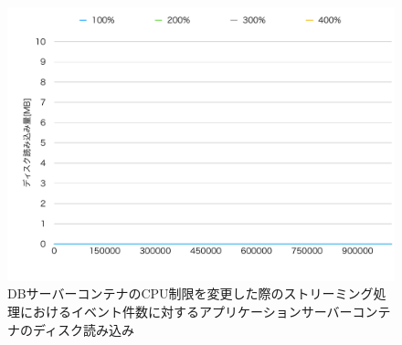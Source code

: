 \documentclass[../../../../../main]{subfiles}
\begin{document}
    \begin{figure}[H]
        \centering
        \includegraphics[width=12cm]{graph}
        \caption{DBサーバーコンテナのCPU制限を変更した際のストリーミング処理におけるイベント件数に対するアプリケーションサーバーコンテナのディスク読み込み}
        \label{fig:stream-change-db-cpu-limit-app-disk-out-app_4_8192-db_1024}
    \end{figure}
\end{document}
